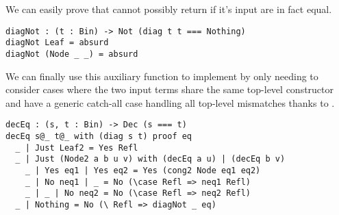 \noindent
We can easily prove that  cannot possibly return 
if it's input are in fact equal.

\begin{verbatim}
diagNot : (t : Bin) -> Not (diag t t === Nothing)
diagNot Leaf = absurd
diagNot (Node _ _) = absurd
\end{verbatim}

\noindent
We can finally use this auxiliary function to implement 
by only needing to consider cases where the two input terms share the same
top-level constructor and have a generic catch-all case handling all top-level
mismatches thanks to .

\begin{verbatim}
decEq : (s, t : Bin) -> Dec (s === t)
decEq s@_ t@_ with (diag s t) proof eq
  _ | Just Leaf2 = Yes Refl
  _ | Just (Node2 a b u v) with (decEq a u) | (decEq b v)
    _ | Yes eq1 | Yes eq2 = Yes (cong2 Node eq1 eq2)
    _ | No neq1 | _ = No (\case Refl => neq1 Refl)
    _ | _ | No neq2 = No (\case Refl => neq2 Refl)
  _ | Nothing = No (\ Refl => diagNot _ eq)
\end{verbatim}
